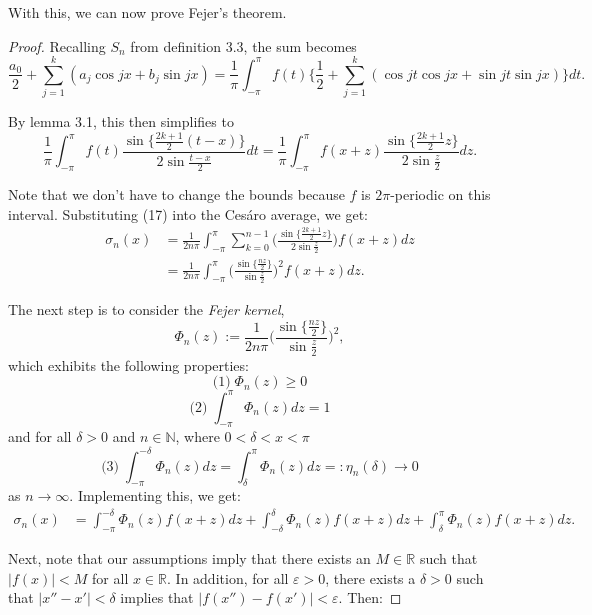 \documentclass{article}
\begin{document}
With this, we can now prove Fejer's theorem.
\begin{proof}
Recalling $S_n$ from definition 3.3, the sum becomes
$$\frac{a_{0}}{2} + \sum_{j=1}^{k} (a_{j}\cos jx + b_{j}\sin jx) = \frac{1}{\pi} \int_{-\pi}^{\pi} f(t)\{\frac{1}{2} + \sum_{j=1}^{k} (\cos jt\cos jx + \sin jt\sin jx)\} dt.$$

By lemma 3.1, this then simplifies to 
\begin{equation}
\frac{1}{\pi} \int_{-\pi}^{\pi} f(t) \frac{ \sin \{\frac{2k+1}{2}(t-x)\}}{2\sin\frac{t-x}{2}}dt = \frac{1}{\pi} \int_{-\pi}^{\pi} f(x+z) \frac{ \sin \{\frac{2k+1}{2}z\}}{2\sin\frac{z}{2}}dz.
\end{equation}

Note that we don't have to change the bounds because $f$ is $2\pi$-periodic on this interval. Substituting (17) into the Ces\'{a}ro average, we get:
\begin{align}
\sigma_{n}(x) &= \frac{1}{2n\pi} \int_{-\pi}^{\pi} \sum_{k=0}^{n-1} \Big( \frac{ \sin \{\frac{2k+1}{2}z\}}{2\sin\frac{z}{2}} \Big)f(x+z)dz \\
&= \frac{1}{2n\pi} \int_{-\pi}^{\pi} \Big( \frac{ \sin \{\frac{nz}{2}\}}{\sin\frac{z}{2}} \Big)^{2}f(x+z)dz.
\end{align}


The next step is to consider the \textit{Fejer kernel},
\begin{equation}
\Phi_{n}(z) := \frac{1}{2n\pi}\Big( \frac{ \sin \{\frac{nz}{2}\}}{\sin\frac{z}{2}} \Big)^{2},
\end{equation}
which exhibits the following properties:
$$
\text{(1)}\; \Phi_{n}(z) \geq 0
$$
$$
\text{(2)}\; \int_{-\pi}^{\pi} \Phi_{n}(z)dz = 1
$$
and for all $\delta > 0$ and $n \in \mathbb{N}$, where $0 < \delta < x < \pi$
$$
\text{(3)}\; \int_{-\pi}^{-\delta} \Phi_{n}(z)dz = \int_{\delta}^{\pi} \Phi_{n}(z)dz =: \eta_{n}(\delta) \to 0
$$
as $n \to \infty$. Implementing this, we get:
\begin{align*}
\sigma_{n}(x) &= \int_{-\pi}^{-\delta} \Phi_{n}(z)f(x+z)dz + \int_{-\delta}^{\delta} \Phi_{n}(z)f(x+z)dz + \int_{\delta}^{\pi} \Phi_{n}(z)f(x+z)dz.
\end{align*}

Next, note that our assumptions imply that there exists an $M \in \mathbb{R}$ such that $\vert f(x) \vert < M$ for all $x \in \mathbb{R}$. In addition, for all $\varepsilon > 0$, there exists a $\delta > 0$ such that $\vert x'' - x' \vert < \delta$ implies that $\vert f(x'') - f(x') \vert < \varepsilon$. Then:


\end{proof}
\end{document}
